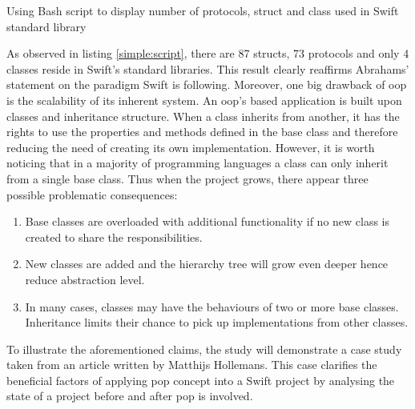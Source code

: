 \documentclass[11pt,a4paper,oneside,article]{memoir}
\begin{document}
\begin{listing}[H]
\caption{Using Bash script to  display number of protocols, struct and class used in Swift standard library}
\label{simple:script}
\end{listing}


As observed in listing \ref{simple:script}, there are 87 structs, 73 protocols and only 4 classes reside in Swift's standard libraries. This result clearly reaffirms Abrahams' statement on the paradigm Swift is following. Moreover, one big drawback of \gls{oop} is the scalability of its inherent system. An \gls{oop}'s based application is built upon classes and inheritance structure. When a class inherits from another, it has the rights to use the properties and methods defined in the base class and therefore reducing the need of creating its own implementation. However, it is worth noticing that in a majority of programming languages a class can only inherit from a single base class. Thus when the project grows, there appear three possible problematic consequences:

\begin{enumerate}
  \item Base classes are overloaded with additional functionality if no new class is created to share the responsibilities.
  \item New classes are added and the hierarchy tree will grow even deeper hence reduce abstraction level.
  \item In many cases, classes may have the behaviours of two or more base classes.  Inheritance limits their chance to pick up implementations from other classes.
\end{enumerate}

To illustrate the aforementioned claims, the study will demonstrate a case study taken from an article written by Matthijs Hollemans\cite{machinethink:pattern}. This case clarifies the beneficial factors of applying \gls{pop} concept into a Swift project by analysing the state of a project before and after \gls{pop} is involved. 
\end{document}
